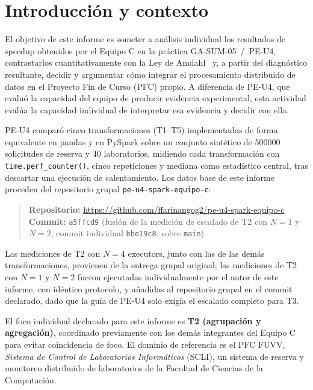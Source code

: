 \documentclass[10pt,journal]{IEEEtran}
\begin{document}
\section{Introducci\'on y contexto}
\label{sec:intro}

El objetivo de este informe es someter a an\'alisis individual los resultados
de speedup obtenidos por el Equipo C en la pr\'actica GA-SUM-05~/~PE-U4,
contrastarlos cuantitativamente con la Ley de Amdahl~\cite{amdahl1967} y, a
partir del diagn\'ostico resultante, decidir y argumentar c\'omo integrar el
procesamiento distribuido de datos en el Proyecto Fin de Curso (PFC) propio.
A diferencia de PE-U4, que evalu\'o la capacidad del equipo de producir
evidencia experimental, esta actividad eval\'ua la capacidad individual de
interpretar esa evidencia y decidir con ella.

PE-U4 compar\'o cinco transformaciones (T1--T5) implementadas de forma
equivalente en pandas y en PySpark sobre un conjunto sint\'etico de
\num{500000} solicitudes de reserva y 40 laboratorios, midiendo cada
transformaci\'on con \texttt{time.perf\_counter()}, cinco repeticiones y
mediana como estad\'istico central, tras descartar una ejecuci\'on de
calentamiento. Los datos base de este informe proceden del repositorio
grupal \texttt{pe-u4-spark-equipo-c}:
\begin{quote}
\small
\textbf{Repositorio:} \url{https://github.com/ffarinangog2/pe-u4-spark-equipo-c}\\
\textbf{Commit:} \texttt{a5ffcd9} (fusi\'on de la medici\'on de escalado de T2
con $N=1$ y $N=2$, commit individual \texttt{bbe19c8}, sobre \texttt{main})
\end{quote}
Las mediciones de T2 con $N=4$ executors, junto con las de las dem\'as
transformaciones, provienen de la entrega grupal original; las mediciones de
T2 con $N=1$ y $N=2$ fueron ejecutadas individualmente por el autor de este
informe, con id\'entico protocolo, y a\~nadidas al repositorio grupal en el
commit declarado, dado que la gu\'ia de PE-U4 solo exig\'ia el escalado
completo para T3.

El foco individual declarado para este informe es \textbf{T2 (agrupaci\'on y
agregaci\'on)}, coordinado previamente con los dem\'as integrantes del Equipo
C para evitar coincidencia de foco. El dominio de referencia es el PFC FUVV,
\emph{Sistema de Control de Laboratorios Inform\'aticos} (SCLI), un sistema de
reserva y monitoreo distribuido de laboratorios de la Facultad de Ciencias de
la Computaci\'on.
\end{document}
